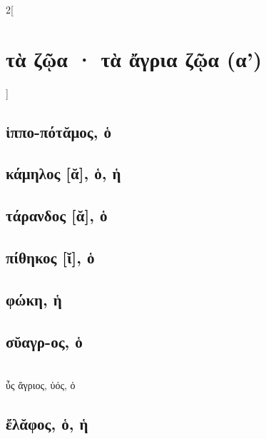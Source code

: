 \documentclass{book}
\begin{document}
\begin{multicols}{2}[\section{τὰ ζῷα · τὰ ἄγρια ζῷα (α')}]
\subsection{ἱππο-πότᾰμος, ὁ}
\subsection{κάμηλος [ᾰ], ὁ, ἡ}
\subsection{τάρανδος [ᾰ], ὁ}
\subsection{πίθηκος [ῐ], ὁ}
\subsection{φώκη, ἡ}
\subsection{σῠαγρ-ος, ὁ}
 ~\\
ὖς ἄγριος, ὑός, ὁ
\subsection{ἔλᾰφος, ὁ, ἡ}
~
\end{multicols}
\newpage  
\end{document}
